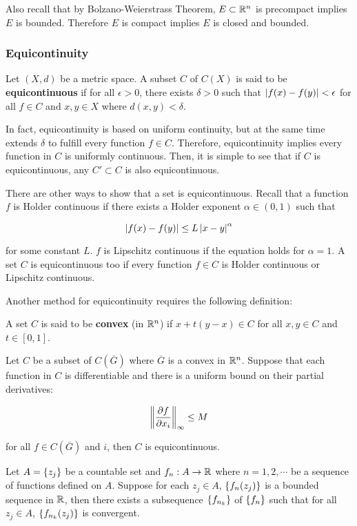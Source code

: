 \documentclass[a4paper,12pt]{article}
\begin{document}
Also recall that by Bolzano-Weierstrass Theorem, $E\subset\mathbb{R}^{n}$ is precompact implies $E$ is bounded. Therefore $E$ is compact implies $E$ is closed and bounded.

\propdisp
\subsubsection{Equicontinuity}
\begin{dft}
  Let $(X,d)$ be a metric space. A subset $C$ of $C(X)$ is said to be \textbf{equicontinuous} if for all $\epsilon>0$, there exists $\delta>0$ such that $\left| f(x)-f(y)\right|<\epsilon$ for all $f\in C$ and $x,y\in X$ where $d(x,y)<\delta$.
\end{dft}\n

In fact, equicontinuity is based on uniform continuity, but at the same time extends $\delta$ to fulfill every function $f\in C$. Therefore, equicontinuity implies every function in $C$ is uniformly continuous. Then, it is simple to see that if $C$ is equicontinuous, any $C'\subset C$ is also equicontinuous.\n

There are other ways to show that a set is equicontinuous. Recall that a function $f$ is Holder continuous if there exists a Holder exponent $\alpha\in(0,1)$ such that

$$\left| f(x)-f(y)\right|\leq L\left| x-y\right|^{\alpha}$$\s

for some constant $L$. $f$ is Lipschitz continuous if the equation holds for $\alpha=1$. A set $C$ is equicontinuous too if every function $f\in C$ is Holder continuous or Lipschitz continuous.

Another method for equicontinuity requires the following definition:\n

\begin{dft}
  A set $C$ is said to be \textbf{convex} (in $\mathbb{R}^{n}$) if $x+t(y-x)\in C$ for all $x,y\in C$ and $t\in[0,1]$.
\end{dft}\n

\begin{pst}
  Let $C$ be a subset of $C(\overline{G})$ where $\overline{G}$ is a convex in $\mathbb{R}^{n}$. Suppose that each function in $C$ is differentiable and there is a uniform bound on their partial derivatives:

  $$\left\| \frac{\partial f}{\partial x_{i}}\right\|_{\infty}\leq M$$\s

  for all $f\in C(\overline{G})$ and $i$, then $C$ is equicontinuous.
\end{pst}\n

\begin{pst}
  Let $A=\left\{ z_{j}\right\}$ be a countable set and $f_{n}:A\to\mathbb{R}$ where $n=1,2,\cdots$ be a sequence of functions defined on $A$. Suppose for each $z_{j}\in A$, $\left\{ f_{n}(z_{j})\right\}$ is a bounded sequence in $\mathbb{R}$, then there exists a subsequence $\left\{ f_{n_{k}}\right\}$ of $\left\{ f_{n}\right\}$ such that for all $z_{j}\in A$, $\left\{ f_{n_{k}}(z_{j})\right\}$ is convergent.
\end{pst}
\end{document}
